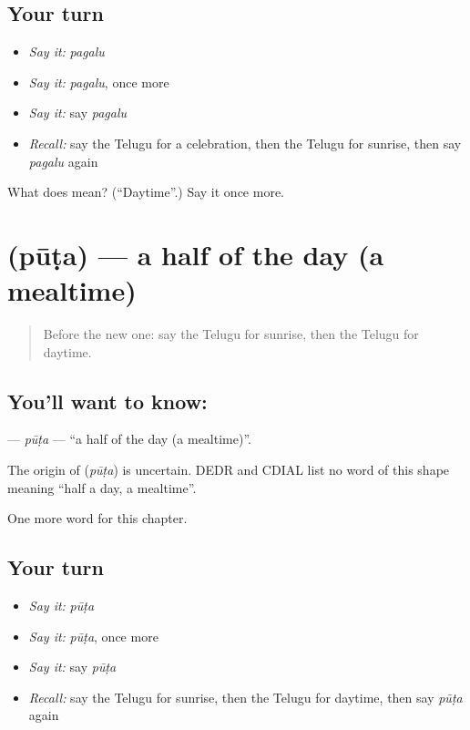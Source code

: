 \subsection*{Your turn}
\begin{itemize}
\raggedright
  \item \emph{Say it:} \emph{pagalu}
  \item \emph{Say it:} \emph{pagalu}, once more
  \item \emph{Say it:} say \emph{pagalu}
  \item \emph{Recall:} say the Telugu for a celebration, then the Telugu for sunrise, then say \emph{pagalu} again
\end{itemize}

\begin{tcolorbox}[breakable,colback=teal!4,colframe=teal!35!black,title={Before you move on}]
What does  mean? (\textquotedblleft{}Daytime\textquotedblright{}.) Say it once more.
\end{tcolorbox}
\section[\texorpdfstring{\te{పూట} (pūṭa)}{పూట (pūṭa)}]{ (pūṭa) — a half of the day (a mealtime)}

\label{lesson:TE-C290-puta}



\begin{quote}
Before the new one: say the Telugu for sunrise, then the Telugu for daytime.
\end{quote}

\subsection*{You'll want to know: }
\textbf{} — \emph{pūṭa} — \textquotedblleft{}a half of the day (a mealtime)\textquotedblright{}.

\begin{cousinweb}
The origin of \textbf{} (\emph{pūṭa}) is uncertain. DEDR and CDIAL list no word of this shape meaning \textquotedblleft{}half a day, a mealtime\textquotedblright{}.
\end{cousinweb}

\begin{grammarlens}[title={What you've built}]
One more word for this chapter.
\end{grammarlens}

\subsection*{Your turn}
\begin{itemize}
\raggedright
  \item \emph{Say it:} \emph{pūṭa}
  \item \emph{Say it:} \emph{pūṭa}, once more
  \item \emph{Say it:} say \emph{pūṭa}
  \item \emph{Recall:} say the Telugu for sunrise, then the Telugu for daytime, then say \emph{pūṭa} again
\end{itemize}

